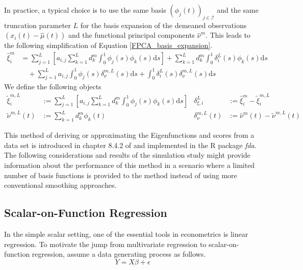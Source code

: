 \documentclass[11pt,twoside,a4paper]{article}
\begin{document}
	\newpage
	In practice, a typical choice is to use the same basis $\left(\phi_j(t)\right)_{j \in \mathcal{I}}$ and the same truncation parameter $L$ for the basis expansion of the demeaned observations $\left(x_i(t) - \hat{\mu}(t)\right)$ and the functional principal components $\hat{\nu}^m$. This leads to the following simplification of Equation \ref{FPCA_basis_expansion}.
	\begin{equation}\label{score_approx}
		\begin{split}
			\hat{\xi}_{i}^m &= \sum_{j = 1}^{L} \left[a_{i,j}\sum_{k = 1}^{L} d_{k}^m \int_{0}^{1} \phi_j(s) \phi_{k}(s)\mathrm{d}s \right] +  \sum_{k = 1}^{L} d_{k}^m \int_{0}^{1} \delta_i^L(s) \phi_{k}(s) \mathrm{d}s \\
			& \quad + \sum_{j = 1}^{L} a_{i,j} \int_{0}^{1}\phi_j(s) \delta_{\nu}^{m,L}(s) \mathrm{d}s + \int_{0}^{1} \delta_i^L(s) \delta_{\nu}^{m,L}(s) \mathrm{d}s
		\end{split}
	\end{equation}
	We define the following objects
		\begin{align}
			\tilde{\xi}^{m,L}_{i} & := \sum_{j = 1}^{L} \left[a_{i,j}\sum_{k = 1}^{L} d_{k}^m \int_{0}^{1} \phi_j(s) \phi_{k}(s)\mathrm{d}s \right] 
			& \delta_{\xi, i}^L & := \hat{\xi}_{i}^m - \tilde{\xi}^{m,L}_{i} \\
			\tilde{\nu}^{m,L}(t) & := \sum_{k = 1}^{L} d_{k}^m \phi_{k}(t) 
			& \delta_{\nu}^{m, L}(t) & := \hat{\nu}^m(t) - \tilde{\nu}^{m,L}(t)
		\end{align}	
	
	This method of deriving or approximating the Eigenfunctions and scores from a data set is introduced in chapter 8.4.2 of \cite{ramsay_functional_2005} and implemented in the R package \textit{fda}. The following considerations and results of the simulation study might provide information about the performance of this method in a scenario where a limited number of basis functions is provided to the method instead of using more conventional smoothing approaches.
	
	\subsection{Scalar-on-Function Regression}\label{Scalar_on_function_regression}
	In the simple scalar setting, one of the essential tools in econometrics is linear regression. To motivate the jump from multivariate regression to scalar-on-function regression, assume a data generating process as follows.
	\begin{equation}
		Y = X\beta + \epsilon
	\end{equation}
	
\end{document}
